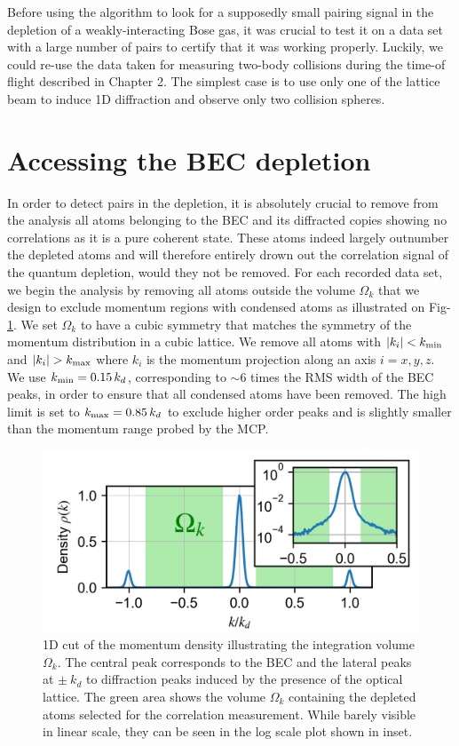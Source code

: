 Before using the algorithm to look for a supposedly small \kmk pairing signal in the depletion of a weakly-interacting Bose gas, it was crucial to test it on a data set with a large number of \kmk pairs to certify that it was working properly. Luckily, we could re-use the data taken for measuring two-body collisions during the time-of flight described in Chapter 2. The simplest case is to use only one of the lattice beam to induce 1D diffraction and observe only two collision spheres. 


\section{Accessing the BEC depletion}
\label{sec:accessing_depletion}

In order to detect \kmk pairs in the depletion, it is absolutely crucial to remove from the analysis all atoms belonging to the BEC and its diffracted copies showing no correlations as it is a pure coherent state. These atoms indeed largely outnumber the depleted atoms and will therefore entirely drown out the \kmk correlation signal of the quantum depletion, would they not be removed. 
For each recorded data set, we begin the analysis by removing all atoms outside the volume $\Omega_k$ that we design to exclude momentum regions with condensed atoms as illustrated on Fig-\ref{fig:omega_k}. We set $\Omega_k$ to have a cubic symmetry that matches the symmetry of the momentum distribution in a cubic lattice. We remove all atoms with $|k_i| < k_{\rm{min}}$ and $|k_i| > k_{\rm{max}}$ where $k_i$ is the momentum projection along an axis $i=x,y,z$. We use $k_{\rm{min}}=0.15 \, k_d$, corresponding to $\sim 6$ times the RMS width of the BEC peaks, in order to ensure that all condensed atoms have been removed. The high limit is set to $k_{\rm{max}}=0.85 \, k_d$ to exclude higher order peaks and is slightly smaller than the momentum range probed by the MCP.

\begin{figure}
    \centering
    \includegraphics[width=\textwidth]{Fig/Chapter4/densite.png}
    \caption{1D cut of the momentum density illustrating the integration volume $\Omega_k$. The central peak corresponds to the BEC and the lateral peaks at $\pm \ k_d$ to diffraction peaks induced by the presence of the optical lattice. The green area shows the volume $\Omega_k$ containing the depleted atoms selected for the correlation measurement. While barely visible in linear scale, they can be seen in the log scale plot shown in inset.}
    \label{fig:omega_k}
\end{figure}


